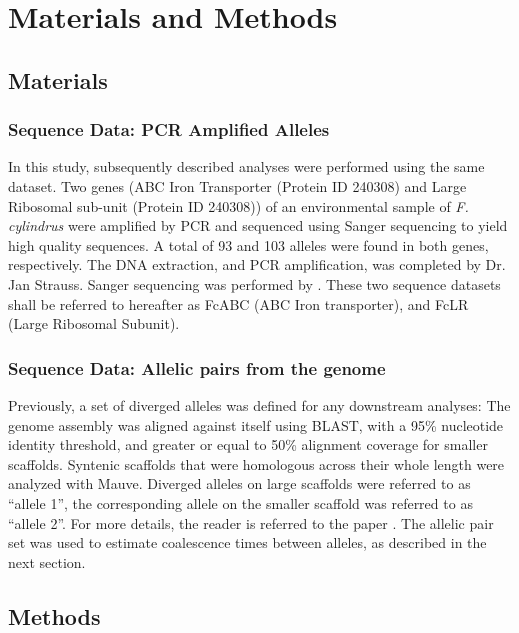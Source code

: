 \section{Materials and Methods}

\subsection{Materials}

\subsubsection{Sequence Data: PCR Amplified Alleles}

In this study, subsequently described analyses were performed using the same
dataset.
Two genes (ABC Iron Transporter (Protein ID 240308) and Large Ribosomal sub-unit
(Protein ID 240308)) of an environmental sample of \textit{F. cylindrus} were
amplified by PCR and sequenced using Sanger sequencing to yield high quality
sequences. A total of 93 and 103 alleles were found in both genes, respectively.
The DNA extraction, and PCR amplification, was completed by Dr. Jan Strauss.
Sanger sequencing was performed by \parencite{Mock2017}.
These two sequence datasets shall be referred to hereafter as FcABC
(ABC Iron transporter), and FcLR (Large Ribosomal Subunit).

\subsubsection{Sequence Data: Allelic pairs from the genome}

Previously, a set of diverged alleles was defined for any downstream analyses:
The genome assembly was aligned against itself using BLAST, with a 95\% nucleotide identity threshold, and greater or equal to 50\% alignment coverage for smaller scaffolds.
Syntenic scaffolds that were homologous across their whole length were analyzed with Mauve.
Diverged alleles on large scaffolds were referred to as “allele 1”, the corresponding allele on the smaller scaffold was referred to as “allele 2”.
For more details, the reader is referred to the paper \parencite{Mock2017}.
The allelic pair set was used to estimate coalescence times between alleles,
as described in the next section.

\subsection{Methods}


